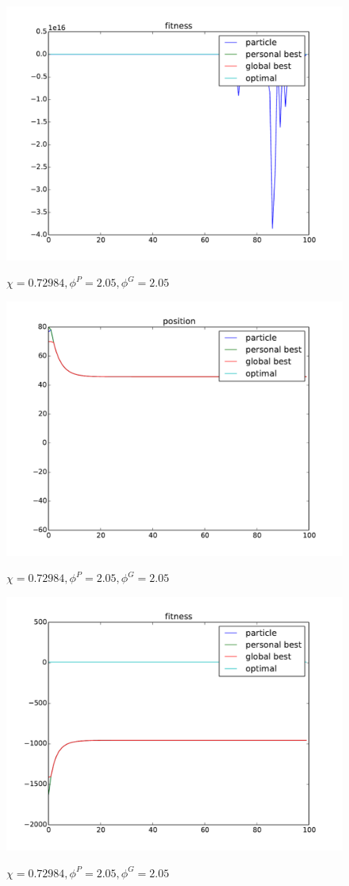\begin{figure}[ht]
\centering
\includegraphics[width=.7\linewidth]{./simfig/case2/fitness2-1} 
\label{fig:case2-1:fitness}
\caption{$ \chi = 0.72984 , \phi^{P} = 2.05 , \phi^{G} = 2.05 $ }
\end{figure}

\begin{figure}[ht]
\centering
\includegraphics[width=.7\linewidth]{./simfig/case2/position2-2} 
\label{fig:case2-2:position}
\caption{$ \chi = 0.72984 , \phi^{P} = 2.05 , \phi^{G} = 2.05 $ }
\end{figure}
  
\begin{figure}[ht]
\centering
\includegraphics[width=.7\linewidth]{./simfig/case2/fitness2-2} 
\label{fig:case2-2:fitness} 
\caption{$ \chi = 0.72984 , \phi^{P} = 2.05 , \phi^{G} = 2.05 $ }
\end{figure}

